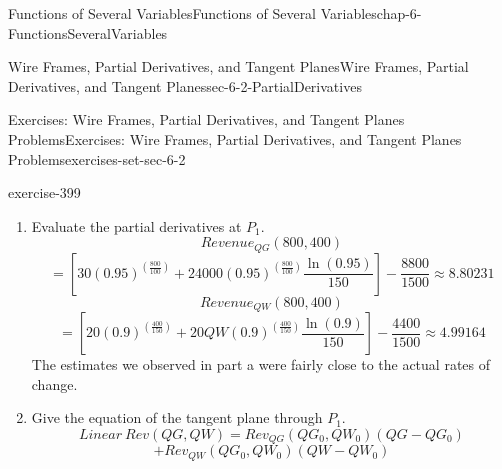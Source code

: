 \documentclass[oneside,10pt,]{book}
\numberwithin{equation}{section}
\begin{document}
\begin{chapterptx}{Functions of Several Variables}{}{Functions of Several Variables}{}{}{chap-6-FunctionsSeveralVariables}
\begin{sectionptx}{Wire Frames, Partial Derivatives, and Tangent Planes}{}{Wire Frames, Partial Derivatives, and Tangent Planes}{}{}{sec-6-2-PartialDerivatives}
\begin{exercises-subsection-numberless}{Exercises: Wire Frames, Partial Derivatives, and Tangent Planes Problems}{}{Exercises: Wire Frames, Partial Derivatives, and Tangent Planes Problems}{}{}{exercises-set-sec-6-2}
\begin{exercisegroup}
\begin{divisionexerciseeg}{5}{}{}{exercise-399}
\begin{enumerate}[label=(\alph*)]
%
\begin{equation*}
= \left[
30 (0.95)^{\left(\frac{QG}{100}\right)}
+30 QG (0.95)^{\left(\frac{QG}{100}\right)} 
\frac{\ln(0.95)}{150}\right]
+0
-  \frac{11*QW}{1500}
\end{equation*}
\hypertarget{p-2277}{}%
Note that the first part requires a product rule and then a chain rule to deal with the exponential part of the formula.%
%
\begin{equation*}
Revenue_{QW}  (QG,QW)
\end{equation*}
%
\begin{equation*}
=  \frac{\partial}{\partial QW} 30 QG (0.95)^{\left(\frac{QG}{100}\right)}
+\frac{\partial}{\partial QW} 20 QW (0.9)^{\left(\frac{QW}{150} \right)}
-\frac{\partial}{\partial QW}  \frac{11*QG*QW}{1500}
\end{equation*}
%
\begin{equation*}
= 0+\left[20 (0.9)^{\left(\frac{QW}{150}\right)}
+20 QW (0.9)^{\left(\frac{QW}{150}\right)} 
\frac{\ln(0.9)}{150}\right]
-  \frac{11*QG}{1500}
\end{equation*}
\item\hypertarget{li-629}{}\hypertarget{p-2278}{}%
Evaluate the partial derivatives at \(P_1\).%
%
\begin{equation*}
Revenue_{QG}  (800, 400)
\end{equation*}
%
\begin{equation*}
= \left[
30 (0.95)^{\left(\frac{800}{100}\right)}
+24000 (0.95)^{\left(\frac{800}{100}\right)} 
\frac{\ln(0.95)}{150}\right]
-  \frac{8800}{1500}\approx 8.80231
\end{equation*}
%
\begin{equation*}
Revenue_{QW}  (800, 400)
\end{equation*}
%
\begin{equation*}
= \left[20 (0.9)^{\left(\frac{400}{150}\right)}
+20 QW (0.9)^{\left(\frac{400}{150}\right)} 
\frac{\ln(0.9)}{150}\right]
-  \frac{4400}{1500}\approx 4.99164
\end{equation*}
\hypertarget{p-2279}{}%
The estimates we observed in part a were fairly close to the actual rates of change.%
\item\hypertarget{li-630}{}\hypertarget{p-2280}{}%
Give the equation of the tangent plane through \(P_1\).%
%
\begin{equation*}
Linear\ Rev(QG,QW)=
Rev_{QG} (QG_0,QW_0 )(QG-QG_0 )
\end{equation*}
%
\begin{equation*}
+Rev_{QW} (QG_0,QW_0 )(QW-QW_0 )

\end{equation*}
\end{enumerate}
\end{divisionexerciseeg}
\end{exercisegroup}
\end{exercises-subsection-numberless}
\end{sectionptx}
\end{chapterptx}
\end{document}
